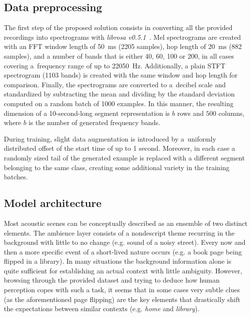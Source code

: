 \documentclass{article}
\begin{document}
\begin{sloppy}
\vspace{-4pt}

\subsection{Data preprocessing}

The first step of the proposed solution consists in converting all the provided recordings into spectrograms with \textit{librosa v0.5.1}~\cite{librosa0.5.0}. Mel spectrograms are created with an FFT window length of 50~ms (2205 samples), hop length of 20~ms (882 samples), and a number of bands that is either 40, 60, 100 or 200, in all cases covering a~frequency range of up to 22050~Hz. Additionally, a plain STFT spectrogram (1103 bands) is created with the same window and hop length for comparison. Finally, the spectrograms are converted to a~decibel scale and standardized by subtracting the mean and dividing by the standard deviation computed on a random batch of 1000 examples. In this manner, the resulting dimension of a 10-second-long segment representation is $b$ rows and $500$ columns, where $b$ is the number of generated frequency bands.

During training, slight data augmentation is introduced by a~uniformly distributed offset of the start time of up to 1 second. Moreover, in each case a randomly sized tail of the generated example is replaced with a different segment belonging to the same class, creating some additional variety in the training batches.

\vspace{-4pt}

\subsection{Model architecture}

Most acoustic scenes can be conceptually described as an ensemble of two distinct elements. The ambience layer consists of a nondescript theme recurring in the background with little to no change (e.g. sound of a noisy street). Every now and then a more specific event of a short-lived nature occurs (e.g. a book page being flipped in a library). In many situations the background information alone is quite sufficient for establishing an actual context with little ambiguity. However, browsing through the provided dataset and trying to deduce how human perception copes with such a task, it seems that in some cases very subtle clues (as the aforementioned page flipping) are the key elements that drastically shift the expectations between similar contexts (e.g. \textit{home} and \textit{library}).


\end{sloppy}
\end{document}
